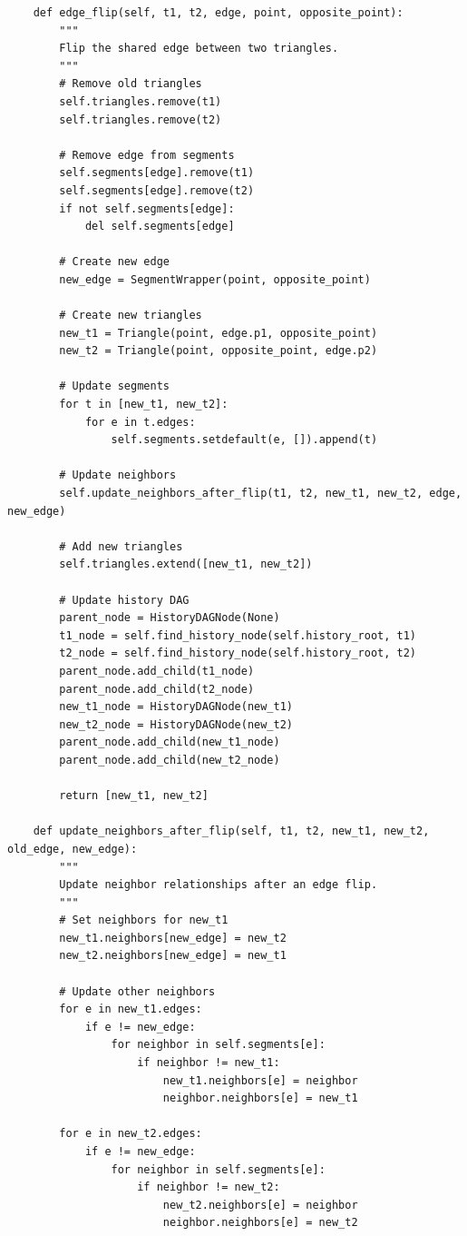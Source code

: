 \documentclass{article}
\begin{document}
\begin{verbatim}
    def edge_flip(self, t1, t2, edge, point, opposite_point):
        """
        Flip the shared edge between two triangles.
        """
        # Remove old triangles
        self.triangles.remove(t1)
        self.triangles.remove(t2)

        # Remove edge from segments
        self.segments[edge].remove(t1)
        self.segments[edge].remove(t2)
        if not self.segments[edge]:
            del self.segments[edge]

        # Create new edge
        new_edge = SegmentWrapper(point, opposite_point)

        # Create new triangles
        new_t1 = Triangle(point, edge.p1, opposite_point)
        new_t2 = Triangle(point, opposite_point, edge.p2)

        # Update segments
        for t in [new_t1, new_t2]:
            for e in t.edges:
                self.segments.setdefault(e, []).append(t)

        # Update neighbors
        self.update_neighbors_after_flip(t1, t2, new_t1, new_t2, edge, new_edge)

        # Add new triangles
        self.triangles.extend([new_t1, new_t2])

        # Update history DAG
        parent_node = HistoryDAGNode(None)
        t1_node = self.find_history_node(self.history_root, t1)
        t2_node = self.find_history_node(self.history_root, t2)
        parent_node.add_child(t1_node)
        parent_node.add_child(t2_node)
        new_t1_node = HistoryDAGNode(new_t1)
        new_t2_node = HistoryDAGNode(new_t2)
        parent_node.add_child(new_t1_node)
        parent_node.add_child(new_t2_node)

        return [new_t1, new_t2]

    def update_neighbors_after_flip(self, t1, t2, new_t1, new_t2, old_edge, new_edge):
        """
        Update neighbor relationships after an edge flip.
        """
        # Set neighbors for new_t1
        new_t1.neighbors[new_edge] = new_t2
        new_t2.neighbors[new_edge] = new_t1

        # Update other neighbors
        for e in new_t1.edges:
            if e != new_edge:
                for neighbor in self.segments[e]:
                    if neighbor != new_t1:
                        new_t1.neighbors[e] = neighbor
                        neighbor.neighbors[e] = new_t1

        for e in new_t2.edges:
            if e != new_edge:
                for neighbor in self.segments[e]:
                    if neighbor != new_t2:
                        new_t2.neighbors[e] = neighbor
                        neighbor.neighbors[e] = new_t2


\end{verbatim}
\end{document}
